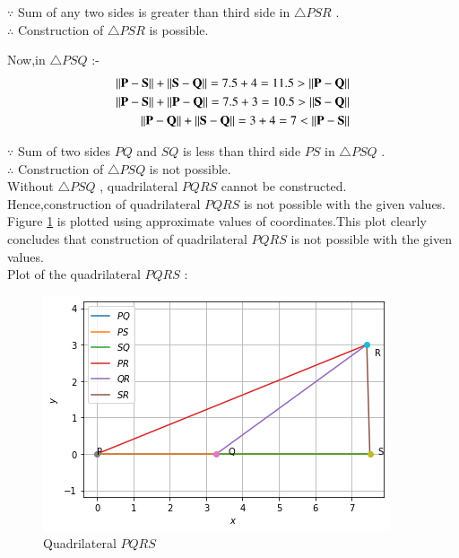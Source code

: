 \documentclass[journal,12pt,twocolumn]{IEEEtran}
\begin{document}
$\because$ Sum of any two sides is greater than third side in $\triangle PSR$ .
\\
$\therefore$ Construction of $\triangle PSR$ is possible.

Now,in $\triangle PSQ$ :-
\begin{align}
\left\lVert\mathbf{P}-\mathbf{S}\right\rVert + \left\lVert\mathbf{S}-\mathbf{Q}\right\rVert = 7.5 + 4 =11.5 > \left\lVert\mathbf{P}-\mathbf{Q}\right\rVert
\\
\left\lVert\mathbf{P}-\mathbf{S}\right\rVert + \left\lVert\mathbf{P}-\mathbf{Q}\right\rVert = 7.5 + 3 =10.5 > \left\lVert\mathbf{S}-\mathbf{Q}\right\rVert
\\
\left\lVert\mathbf{P}-\mathbf{Q}\right\rVert + \left\lVert\mathbf{S}-\mathbf{Q}\right\rVert = 3 + 4 =7 < \left\lVert\mathbf{P}-\mathbf{S}\right\rVert
\end{align}

$\because$ Sum of two sides $PQ$ and $SQ$ is less than third side $PS$ in $\triangle PSQ$ .
\\
$\therefore$ Construction of $\triangle PSQ$ is not possible.
\\
Without $\triangle PSQ$ , quadrilateral $PQRS$ cannot be constructed.
\\
Hence,construction of quadrilateral $PQRS$ is not possible with the given values.
\\
Figure \ref{fig:quadrilateral} is plotted using approximate values of coordinates.This plot clearly concludes that construction of quadrilateral $PQRS$ is not possible with the given values.
\\
Plot of the quadrilateral $PQRS$ :
\begin{figure}[!ht]
\centering
\includegraphics[width=\columnwidth]{Figure2}
\caption{Quadrilateral $PQRS$}
\label{fig:quadrilateral}	
\end{figure}
\end{document}
